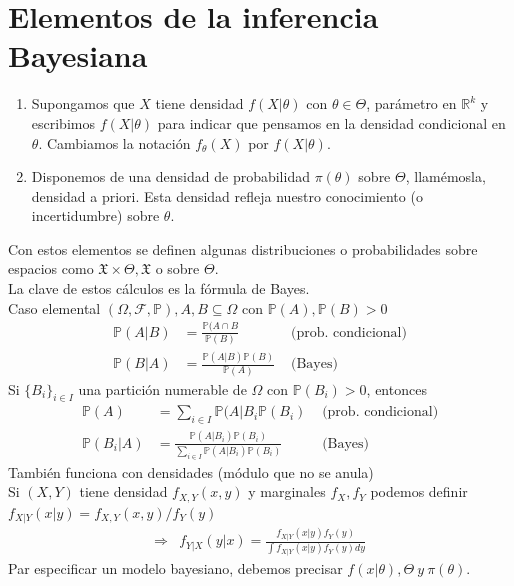 \documentclass[10pt]{article}
\theoremstyle{plain}
\theoremstyle{definition}
\begin{document}
\section{Elementos de la inferencia Bayesiana}
\begin{enumerate}
\item Supongamos que $X$ tiene densidad $f(X|\theta)$ con $\theta \in \Theta$, parámetro en $\mathbb{R}^k$ y escribimos $f(X|\theta)$ para indicar que pensamos en la densidad condicional en $\theta$. Cambiamos la notación $f_{\theta}(X)$ por $f(X|\theta)$.
\item Disponemos de una densidad de probabilidad $\pi(\theta)$ sobre $\Theta$, llamémosla, densidad a priori. Esta densidad refleja nuestro conocimiento (o incertidumbre) sobre $\theta$.\\
\end{enumerate}
Con estos elementos se definen algunas distribuciones o probabilidades sobre espacios como $\mathfrak{X}\times\Theta,\mathfrak{X}$ o sobre $\Theta$.\\
La clave de estos cálculos es la fórmula de Bayes.\\
Caso elemental $(\Omega,\mathcal{F}, \mathbb{P}), A, B \subseteq \Omega$ con $\mathbb{P}(A), \mathbb{P}(B) >0$
\begin{align*}
\mathbb{P}(A|B) &= \frac{\mathbb{P}(A\cap B}{\mathbb{P}(B)}&\text{ (prob. condicional)}\\
\mathbb{P}(B|A) &= \frac{\mathbb{P}(A|B)\mathbb{P}(B)}{\mathbb{P}(A)} & \text{ (Bayes)}
\end{align*}
Si $\{B_{i}\}_{i\in I}$ una partición numerable de $\Omega$ con $\mathbb{P}(B_{i})>0$, entonces
\begin{align*}
\mathbb{P}(A) &= \sum_{i \in I}\mathbb{P}(A|B_{i}\mathbb{P}(B_{i})&\text{ (prob. condicional)}\\
\mathbb{P}(B_{i}|A) &= \frac{\mathbb{P}(A|B_{i})\mathbb{P}(B_{i})}{\sum_{i\in I}\mathbb{P}(A|B_{i})\mathbb{P}(B_{i})} & \text{ (Bayes)}
\end{align*}
También funciona con densidades (módulo que no se anula)\\
Si $(X,Y)$ tiene densidad $f_{X,Y}(x,y)$ y marginales $f_{X}, f_{Y}$ podemos definir $f_{X|Y}(x|y) = f_{X,Y}(x,y)/f_{Y}(y)$
\begin{align*}
\Rightarrow & f_{Y|X}(y|x) = \frac{f_{X|Y}(x|y)f_{Y}(y)}{\int f_{X|Y}(x|y)f_{Y}(y) dy}
\end{align*}
Par especificar un modelo bayesiano, debemos precisar $f(x|\theta), \Theta\ y\ \pi(\theta)$.\\
\end{document}
